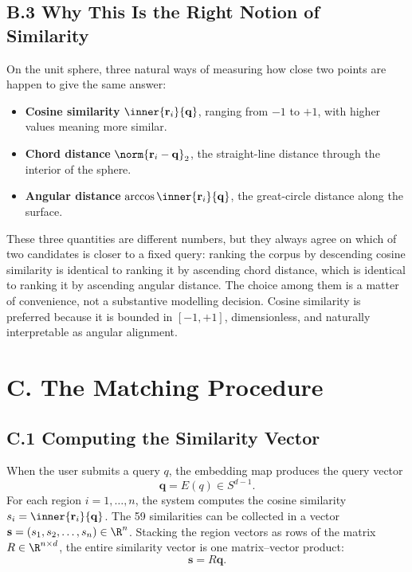 \documentclass[11pt]{article}
\begin{document}
\subsection*{B.3 Why This Is the Right Notion of Similarity}
On the unit sphere, three natural ways of measuring how close two points are happen to give the same answer:
\begin{itemize}[leftmargin=2em,itemsep=0.2em]
\item \textbf{Cosine similarity} $\inner{\mathbf{r}_i}{\mathbf{q}}$, ranging from $-1$ to $+1$, with higher values meaning more similar.
\item \textbf{Chord distance} $\norm{\mathbf{r}_i - \mathbf{q}}_2$, the straight-line distance through the interior of the sphere.
\item \textbf{Angular distance} $\arccos\inner{\mathbf{r}_i}{\mathbf{q}}$, the great-circle distance along the surface.
\end{itemize}
These three quantities are different numbers, but they always agree on which of two candidates is closer to a fixed query: ranking the corpus by descending cosine similarity is identical to ranking it by ascending chord distance, which is identical to ranking it by ascending angular distance. The choice among them is a matter of convenience, not a substantive modelling decision. Cosine similarity is preferred because it is bounded in $[-1, +1]$, dimensionless, and naturally interpretable as angular alignment.

\section*{C. The Matching Procedure}

\subsection*{C.1 Computing the Similarity Vector}
When the user submits a query $q$, the embedding map produces the query vector
\[
\mathbf{q} = E(q) \in S^{d-1}.
\]
For each region $i = 1, \ldots, n$, the system computes the cosine similarity $s_i = \inner{\mathbf{r}_i}{\mathbf{q}}$. The 59 similarities can be collected in a vector $\mathbf{s} = (s_1, s_2, \ldots, s_n) \in \R^n$. Stacking the region vectors as rows of the matrix $R \in \R^{n \times d}$, the entire similarity vector is one matrix--vector product:
\[
\mathbf{s} = R \mathbf{q}.
\]
\end{document}
